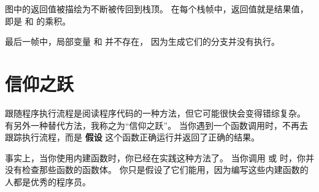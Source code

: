 
图中的返回值被描绘为不断被传回到栈顶。 在每个栈帧中，返回值就是结果值，即是  和  的乘积。
  


最后一帧中，局部变量  和  并不存在， 因为生成它们的分支并没有执行。


\section{信仰之跃}
  


跟随程序执行流程是阅读程序代码的一种方法，但它可能很快会变得错综复杂。
有另外一种替代方法，我称之为``信仰之跃''。
当你遇到一个函数调用时，不再去跟踪执行流程，而是 {\bf 假设} 这个函数正确运行并返回了正确的结果。


事实上，当你使用内建函数时，你已经在实践这种方法了。
当你调用  或  时，你并没有检查那些函数的函数体。
你只是假设了它们能用，因为编写这些内建函数的人都是优秀的程序员。


